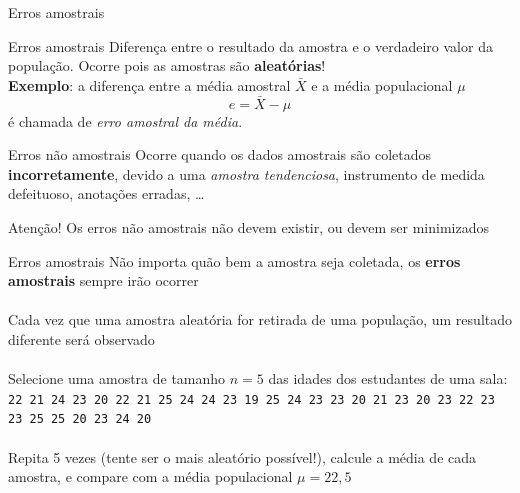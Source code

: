 \documentclass[10pt]{beamer}\usepackage[]{graphicx}\usepackage[]{color}
\theoremstyle{definition}
\begin{document}
\begin{frame}{Erros amostrais}
  \begin{block}{Erros amostrais}
    Diferença entre o resultado da amostra e o verdadeiro valor da
    população. Ocorre pois as amostras são \textbf{aleatórias}! \\
    \textbf{Exemplo}: a diferença entre a média amostral $\bar{X}$ e a
    média populacional $\mu$
    \begin{equation*}
      e = \bar{X} - \mu
    \end{equation*}
    é chamada de \textit{erro amostral da média}.
  \end{block}
  \vspace{1em}
  \begin{block}{Erros não amostrais}
    Ocorre quando os dados amostrais são coletados
    \textbf{incorretamente}, devido a uma \textsl{amostra tendenciosa},
    instrumento de medida defeituoso, anotações erradas, \ldots
  \end{block}
  \pause
  \begin{alertblock}{Atenção!}
    Os erros não amostrais não devem existir, ou devem ser minimizados
  \end{alertblock}
\end{frame}

\begin{frame}{Erros amostrais}
  Não importa quão bem a amostra seja coletada, os \textbf{erros
    amostrais} sempre irão ocorrer\\~\\
  Cada vez que uma amostra aleatória for retirada de uma população, um
  resultado diferente será observado\\~\\
  Selecione uma amostra de tamanho $n = 5$ das idades dos estudantes de
  uma sala: \texttt{22 21 24 23 20 22 21 25 24 24 23 19
    25 24 23 23 20 21 23 20 23
    22 23 23 25 25 20 23 24 20}\\~\\
  Repita 5 vezes (tente ser o mais aleatório possível!), calcule a média
  de cada amostra, e compare com a média populacional $\mu = 22,5$
\end{frame}
\end{document}
